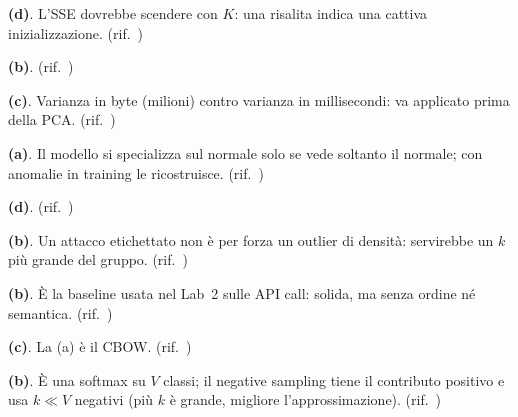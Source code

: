 \begin{soluzione}
\textbf{(d)}. L'SSE dovrebbe scendere con $K$: una risalita indica una cattiva inizializzazione. (rif.\ )
\end{soluzione}

\begin{soluzione}
\textbf{(b)}. (rif.\ )
\end{soluzione}

\begin{soluzione}
\textbf{(c)}. Varianza in byte (milioni) contro varianza in millisecondi: va applicato  prima della PCA. (rif.\ )
\end{soluzione}

\begin{soluzione}
\textbf{(a)}. Il modello si specializza sul normale solo se vede soltanto il normale; con anomalie in training le ricostruisce. (rif.\ )
\end{soluzione}

\begin{soluzione}
\textbf{(d)}. (rif.\ )
\end{soluzione}

\begin{soluzione}
\textbf{(b)}. Un attacco etichettato non è per forza un outlier di densità: servirebbe un $k$ più grande del gruppo. (rif.\ )
\end{soluzione}

\begin{soluzione}
\textbf{(b)}. È la baseline usata nel Lab~2 sulle API call: solida, ma senza ordine né semantica. (rif.\ )
\end{soluzione}

\begin{soluzione}
\textbf{(c)}. La (a) è il CBOW. (rif.\ )
\end{soluzione}

\begin{soluzione}
\textbf{(b)}. È una softmax su $V$ classi; il negative sampling tiene il contributo positivo e usa $k \ll V$ negativi (più $k$ è grande, migliore l'approssimazione). (rif.\ )
\end{soluzione}

